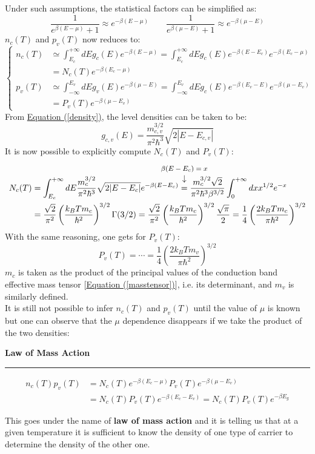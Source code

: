 \documentclass[10.75pt,a4paper,openright,bottom=2cm]{article}
\renewcommand{\refeq}[1]{\hyperref[#1]{Equation (\ref{#1})}}
\begin{document}
Under such assumptions, the statistical factors can be simplified as:
\[
\frac{1}{e^{\beta(E-\mu)}+1}\approx e^{-\beta(E-\mu)} \qquad \frac{1}{e^{\beta(\mu-E)}+1}\approx e^{-\beta(\mu-E)}
\]
$n_c(T)$ and $p_v(T)$ now reduces to:
\begin{equation}
\label{ncpv}
\left\{
\begin{aligned}
n_c(T)&\simeq\int_{E_c}^{+\infty} dEg_c(E)e^{-\beta(E-\mu)}=\int_{E_c}^{+\infty} dEg_c(E)e^{-\beta(E-E_c)}e^{-\beta(E_c-\mu)}\\
&=N_c(T)e^{-\beta(E_c-\mu)}\\
p_v(T)&\simeq\int_{-\infty}^{E_v} dEg_v(E)e^{-\beta(\mu-E)}=\int_{-\infty}^{E_v} dEg_c(E)e^{-\beta(E_v-E)}e^{-\beta(\mu-E_v)}\\
&=P_v(T)e^{-\beta(\mu-E_v)}
\end{aligned}
\right.
\end{equation}
From \refeq{density}, 
the level densities can be taken to be:
\[
g_{c,v}(E)=\frac{m_{c,v}^{3/2}}{\pi^2\hbar^3}\sqrt{2|E-E_{c,v}|}
\]
It is now possible to explicitly compute $N_c(T)$ and $P_v(T)$:
\begin{align*}
N_c(T)&=\int_{E_c}^{+\infty} dE\frac{m_c^{3/2}}{\pi^2\hbar^3}\sqrt{2|E-E_c|}e^{-\beta(E-E_c)}\overset{\mathclap{\tikz \node {$\downarrow$} node [above=1ex] {\footnotesize $\beta(E-E_c)=x$ };}}
{=}\frac{m_c^{3/2}\sqrt{2}}{\pi^2\hbar^3\beta^{3/2}}\int_0^{+\infty}dxx^{1/2}e^{-x}\\
&=\frac{\sqrt{2}}{\pi^2}\left(\frac{k_BTm_c}{\hbar^2}\right)^{3/2}\Gamma(3/2)=\frac{\sqrt{2}}{\pi^2}\left(\frac{k_BTm_c}{\hbar^2}\right)^{3/2}\frac{\sqrt{\pi}}{2}=\frac{1}{4}\left(\frac{2k_BTm_c}{\pi\hbar^2}\right)^{3/2}
\end{align*}
With the same reasoning, one gets for $P_v(T)$:
\[
P_v(T)=\cdots=\frac{1}{4}\left(\frac{2k_BTm_v}{\pi\hbar^2}\right)^{3/2}
\]
$m_c$ is taken as the product of the principal values of the conduction band effective mass tensor [\refeq{masstensor}], i.e. its determinant, and $m_v$ is similarly defined.\\
It is still not possible to infer $n_c(T)$ and $p_v(T)$ until the value of $\mu$ is known but one can observe that the $\mu$ dependence disappears if we take the product of the two densities:
\begin{mybox}
\textbf{Law of Mass Action{\color{blue!30}{g}}}
\hrule
\vspace{0.2cm}
\begin{align*}
n_c(T)p_v(T)&=N_c(T)e^{-\beta(E_c-\mu)}P_v(T)e^{-\beta(\mu-E_v)}\\
&=N_c(T)P_v(T)e^{-\beta(E_c-E_v)}=N_c(T)P_v(T)e^{-\beta E_g}
\end{align*}
\end{mybox}\noindent
This goes under the name of \textbf{law of mass action} and it is telling us that at a given temperature it is sufficient to know the density of one type of carrier to determine the density of the other one.
\end{document}
